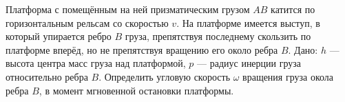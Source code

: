 Платформа с помещённым на ней призматическим грузом $AB$ катится
по горизонтальным рельсам со скоростью $v$.
На платформе имеется выступ, в который упирается ребро $B$ груза,
препятствуя последнему скользить по платформе вперёд,
но не препятствуя вращению его около ребра $B$.
Дано: $h$ --- высота центра масс груза над платформой,
$p$ --- радиус инерции груза относительно ребра $B$.
Определить угловую скорость $\omega$ вращения груза окола ребра $B$,
в момент мгновенной остановки платформы.
